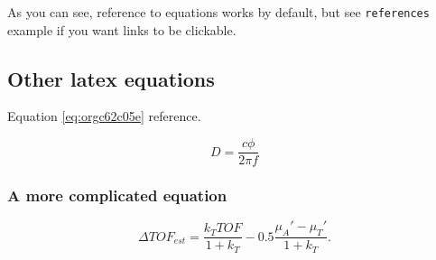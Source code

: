 As you can see, reference to equations works by default, but see \texttt{references}
example if you want links to be clickable.

\subsection{Other latex equations}
\label{sec:org18c1893}
Equation \ref{eq:orgc62c05e} reference.

\begin{equation}
\label{eq:orgc62c05e}
D = \frac{c\phi}{2\pi f}
\end{equation}

\subsubsection{A more complicated equation}
\label{sec:org098844f}

\begin{equation}
\Delta TOF_{est} = \frac{k_T TOF}{1+k_T } - 0.5 \frac{\mu_A' - \mu_T'}{1+k_T}.
\end{equation}


